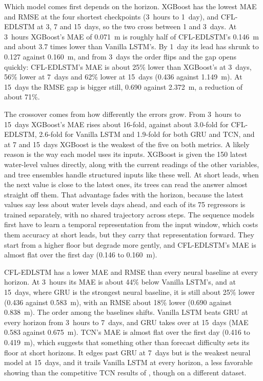 Which model comes first depends on the horizon. XGBoost has the lowest MAE and
RMSE at the four shortest checkpoints (3~hours to 1~day), and CFL-EDLSTM at 3, 7
and 15~days, so the two cross between 1 and 3~days. At 3~hours XGBoost's MAE of
0.071~m is roughly half of CFL-EDLSTM's 0.146~m and about 3.7 times lower than
Vanilla LSTM's. By 1~day its lead has shrunk to 0.127 against 0.160~m, and from
3~days the order flips and the gap opens quickly: CFL-EDLSTM's MAE is about 25\%
lower than XGBoost's at 3~days, 56\% lower at 7~days and 62\% lower at 15~days
(0.436 against 1.149~m). At 15~days the RMSE gap is bigger still, 0.690 against
2.372~m, a reduction of about 71\%.

The crossover comes from how differently the errors grow. From 3~hours to
15~days XGBoost's MAE rises about 16-fold, against about 3.0-fold for
CFL-EDLSTM, 2.6-fold for Vanilla LSTM and 1.9-fold for both GRU and TCN, and at 7
and 15~days XGBoost is the weakest of the five on both metrics. A likely reason
is the way each model uses its inputs. XGBoost is given the 150 latest
water-level values directly, along with the current readings of the other
variables, and tree ensembles handle structured inputs like these well. At short
leads, when the next value is close to the latest ones, its trees can read the
answer almost straight off them. That advantage fades with the horizon, because
the latest values say less about water levels days ahead, and each of its 75
regressors is trained separately, with no shared trajectory across steps. The
sequence models first have to learn a temporal representation from the input
window, which costs them accuracy at short leads, but they carry that
representation forward. They start from a higher floor but degrade more gently,
and CFL-EDLSTM's MAE is almost flat over the first day (0.146 to 0.160~m).

CFL-EDLSTM has a lower MAE and RMSE than every neural baseline at every horizon.
At 3~hours its MAE is about 44\% below Vanilla LSTM's, and at 15~days, where GRU
is the strongest neural baseline, it is still about 25\% lower (0.436 against
0.583~m), with an RMSE about 18\% lower (0.690 against 0.838~m). The order among
the baselines shifts. Vanilla LSTM beats GRU at every horizon from 3~hours to
7~days, and GRU takes over at 15~days (MAE 0.583 against 0.675~m). TCN's MAE is
almost flat over the first day (0.416 to 0.419~m), which suggests that something
other than forecast difficulty sets its floor at short horizons. It edges past
GRU at 7~days but is the weakest neural model at 15~days, and it trails Vanilla
LSTM at every horizon, a less favorable showing than the competitive TCN results
of \cite{Lin2021}, though on a different dataset.


